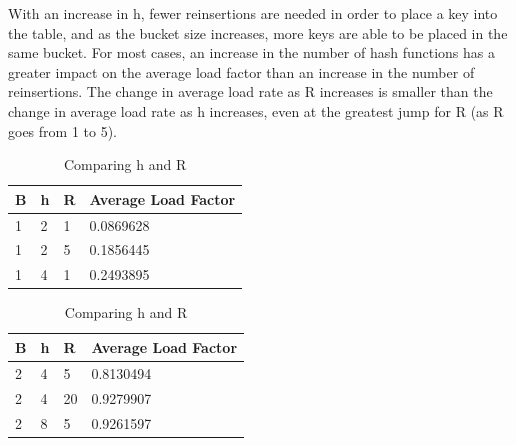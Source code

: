 \documentclass[11pt]{article}
\begin{document}
With an increase in h, fewer reinsertions are needed in order to place a key into the table, and as the bucket size increases, more keys are able to be placed in the same bucket. 
For most cases, an increase in the number of hash functions has a greater impact on the average load factor than an increase in the number of reinsertions.
The change in average load rate as R increases is smaller than the change in average load rate as h increases, even at the greatest jump for R (as R goes from 1 to 5).

\begin{table}
\parbox{.45\linewidth}{
\centering
\small
\begin{tabular}{|l|l|l|l|}
\hline
\textbf{B} & \textbf{h}  &\textbf{R} &\textbf{Average Load Factor} \\ \hline
1          & 2          & 1        &0.0869628 \\ \hline
1          & 2          & 5        &0.1856445 \\ \hline
1          & 4          & 1        &0.2493895 \\ \hline
\end{tabular}
\caption{Comparing h and R}
}
\hfill
\parbox{.45\linewidth}{
\centering
\small
\begin{tabular}{|l|l|l|l|}
\hline
\textbf{B} & \textbf{h}  &\textbf{R} &\textbf{Average Load Factor} \\ \hline
2          & 4          & 5        &0.8130494 \\ \hline
2          & 4          & 20        &0.9279907 \\ \hline
2          & 8          & 5        &0.9261597 \\ \hline
\end{tabular}
\caption{Comparing h and R}
}
\end{table}
\end{document}
